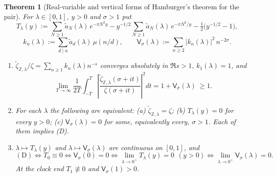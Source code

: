 \documentclass[11pt,reqno]{amsart}
\numberwithin{equation}{section}
\theoremstyle{plain}
\newtheorem{theorem}{Theorem}[section]
\theoremstyle{definition}
\theoremstyle{remark}
\newcommand{\Z}{\mathbb Z}
\begin{document}
\begin{theorem}[Real-variable and vertical forms of Hamburger's theorem for the pair]\label{thm:double-hamburger}
For $\lambda\in[0,1]$, $y>0$ and $\sigma>1$ put
\begin{equation}\label{eq:theta-defect}
 T_\lambda(y):=\sum_{N\ge1}\tilde a_N(\lambda)\,e^{-\pi N^2y}-y^{-1/2}\sum_{N\ge1}\tilde a_N(\lambda)\,e^{-\pi N^2/y}-\tfrac12\bigl(y^{-1/2}-1\bigr),
\end{equation}
\begin{equation}\label{eq:vertical-defect}
 k_n(\lambda):=\sum_{d\mid n}\tilde a_d(\lambda)\,\mu(n/d),\qquad \mathsf V_\sigma(\lambda):=\sum_{n\ge2}|k_n(\lambda)|^2\,n^{-2\sigma}.
\end{equation}
\begin{enumerate}[label=\textup{(\roman*)}]
\item $\tilde\zeta_{\Z,\lambda}/\zeta=\sum_{n\ge1}k_n(\lambda)n^{-s}$ converges absolutely in $\Re s>1$, $k_1(\lambda)=1$, and
\begin{equation}\label{eq:vertical-mean}
 \lim_{T\to\infty}\frac1{2T}\int_{-T}^{T}\left|\frac{\tilde\zeta_{\Z,\lambda}(\sigma+it)}{\zeta(\sigma+it)}\right|^2dt=1+\mathsf V_\sigma(\lambda)\ \ge1 .
\end{equation}
\item For each $\lambda$ the following are equivalent: \textup{(a)} $\tilde\zeta_{\Z,\lambda}=\zeta$; \textup{(b)} $T_\lambda(y)=0$ for every $y>0$; \textup{(c)} $\mathsf V_\sigma(\lambda)=0$ for some, equivalently every, $\sigma>1$.  Each of them implies (D).
\item $\lambda\mapsto T_\lambda(y)$ and $\lambda\mapsto\mathsf V_\sigma(\lambda)$ are continuous on $[0,1]$, and
\begin{equation}\label{eq:double-hamburger-limit}
 (\mathrm D)\iff T_0\equiv0\iff\mathsf V_\sigma(0)=0\iff\lim_{\lambda\to0^+}T_\lambda(y)=0\ \ (y>0)\iff\lim_{\lambda\to0^+}\mathsf V_\sigma(\lambda)=0 .
\end{equation}
At the clock end $T_1\not\equiv0$ and $\mathsf V_\sigma(1)>0$.
\end{enumerate}
\end{theorem}
\end{document}
